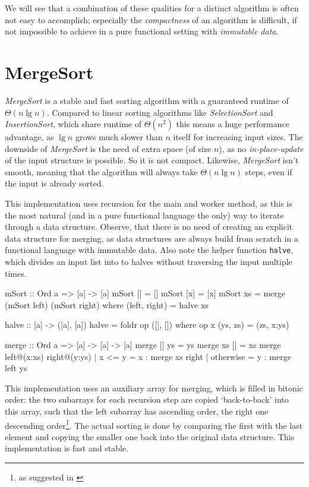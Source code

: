 We will see that a combination of these qualities for a distinct algorithm is often not easy to accomplish; especially the \emph{compactness} of an algorithm is difficult, if not impossible to achieve in a pure functional setting with \emph{immutable data}.

\section{MergeSort}

\emph{MergeSort} is a stable and fast sorting algorithm with a guaranteed runtime of $\Theta (n \lg n)$.
Compared to linear sorting algorithms like \emph{SelectionSort} and \emph{InsertionSort}, which share runtime of $\Theta (n^2)$ this means a huge performance advantage, as $\lg n$ grows much slower than $n$ itself for increasing input sizes.  
The downside of \emph{MergeSort} is the need of extra space (of size $n$), as no \emph{in-place-update} of the input structure is possible. So it is not compact. Likewise, \emph{MergeSort} isn't smooth, meaning that the algorithm will always take $\Theta (n \lg n)$ steps, even if the input is already sorted.

\begin{impl} \label{impl:mshaskell}
This implementation uses recursion for the main and worker method, as this is the most natural (and in a pure functional language the only) way to iterate through a data structure.
Observe, that there is no need of creating an explicit data structure for merging, as data structures are always build from scratch in a functional language with immutable data.
Also note the helper function \texttt{halve}, which divides an input list into to halves without traversing the input multiple times.
\end{impl}

\begin{haskellcode}
mSort :: Ord a => [a] -> [a]
mSort [] = []
mSort [x] = [x]
mSort xs = merge (mSort left) (mSort right)
           where (left, right) = halve xs

halve :: [a] -> ([a], [a])
halve = foldr op ([], []) where op x (ys, zs) = (zs, x:ys)

merge :: Ord a => [a] -> [a] -> [a]
merge [] ys = ys
merge xs [] = xs
merge left@(x:xs) right@(y:ys)
    | x <= y    = x : merge xs right
    | otherwise = y : merge left ys
\end{haskellcode}

\begin{impl} 
This implementation uses an auxiliary array for merging, which is filled in bitonic order:
the two subarrays for each recursion step are copied `back-to-back' into this array, such that the left subarray has ascending order, the right one descending order\footnote{as suggested in \autocite[chapter 8]{algsc98}}.
The actual sorting is done by comparing the first with the last element and copying the smaller one back into the original data structure. This implementation is fast and stable.
\end{impl}

